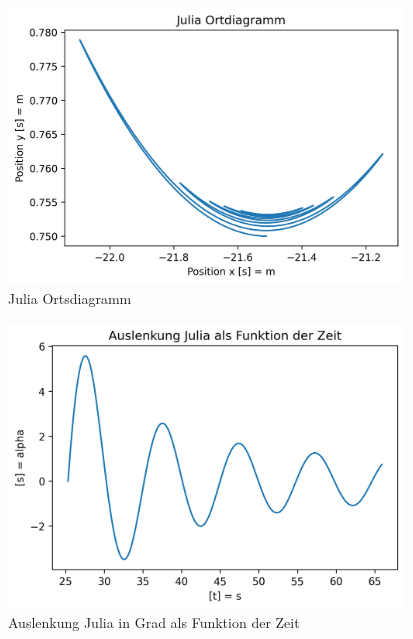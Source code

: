 \documentclass[../main.tex]{subfiles}
\begin{document}
    \begin{figure}[H]
        \begin{center}
            \centerline{\includegraphics[width=105mm]{./images/ropeJulia/Ortdiagramm}}
            \caption{Julia Ortsdiagramm}
            \label{fig:JuliaOrtsdiagramm}
        \end{center}
    \end{figure}


    \begin{figure}[H]
        \begin{center}
            \centerline{\includegraphics[width=105mm]{./images/ropeJulia/AuslenkungDeg}}
            \caption{Auslenkung Julia in Grad als Funktion der Zeit}
            \label{fig:AuslenkungJulia}
        \end{center}
    \end{figure}
\end{document}
